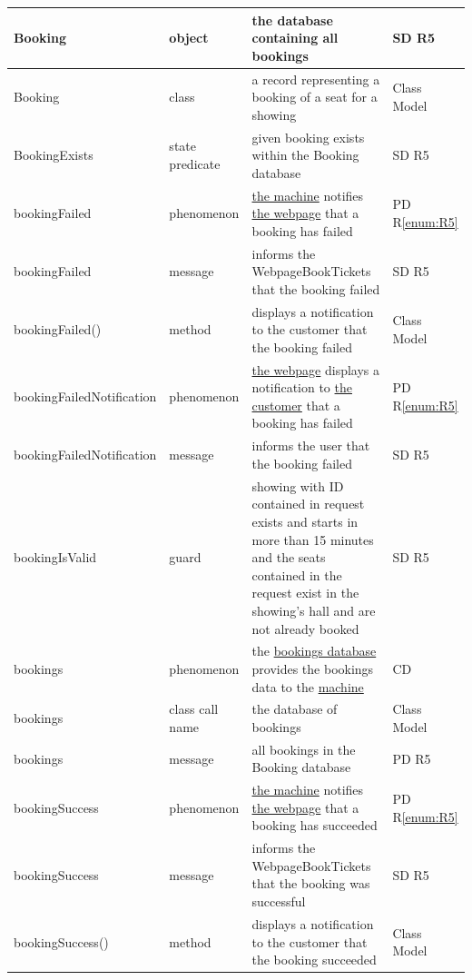 \documentclass[a4paper,10pt,titlepage,bibtotoc,bibtotocnumbered]{scrreprt}
\begin{document}
\begin{longtable}{|p{4cm}|p{3cm}|p{5cm}|l|}
\hline
Booking & object & the database containing all bookings & SD R5\\
\hline
Booking & class & a record representing a booking of a seat for a showing & Class Model\\
\hline
BookingExists & state predicate & given booking exists within the Booking database & SD R5\\
\hline
\hypertarget{glossary:bookingFailed}{bookingFailed} & phenomenon & \hyperlink{glossary:UDEKino}{the machine} notifies \hyperlink{glossary:WebpageBookTickets}{the webpage} that a booking has failed & PD R\ref{enum:R5}\\
\hline
bookingFailed & message & informs the WebpageBookTickets that the booking failed & SD R5\\
\hline
bookingFailed() & method & displays a notification to the customer that the booking failed & Class Model\\
\hline
\hypertarget{glossary:bookingFailedNotification}{bookingFailedNotification} & phenomenon & \hyperlink{glossary:WebpageBookTickets}{the webpage} displays a notification to \hyperlink{glossary:Customer}{the customer} that a booking has failed & PD R\ref{enum:R5}\\
\hline
bookingFailedNotification & message & informs the user that the booking failed & SD R5\\
\hline
bookingIsValid & guard & showing with ID contained in request exists and starts in more than 15 minutes and the seats contained in the request exist in the showing's hall and are not already booked & SD R5\\
\hline
\hypertarget{glossary:bookings}{bookings} & phenomenon & the \hyperlink{glossary:Booking}{bookings database} provides the bookings data to the \hyperlink{glossary:UDEKino}{machine} & CD\\
\hline
bookings & class call name & the database of bookings & Class Model\\
\hline
bookings & message & all bookings in the Booking database & PD R5\\
\hline
\hypertarget{glossary:bookingSuccess}{bookingSuccess} & phenomenon & \hyperlink{glossary:UDEKino}{the machine} notifies \hyperlink{glossary:WebpageBookTickets}{the webpage} that a booking has succeeded & PD R\ref{enum:R5}\\
\hline
bookingSuccess & message & informs the WebpageBookTickets that the booking was successful & SD R5\\
\hline
bookingSuccess() & method & displays a notification to the customer that the booking succeeded & Class Model\\

\end{longtable}
\end{document}
